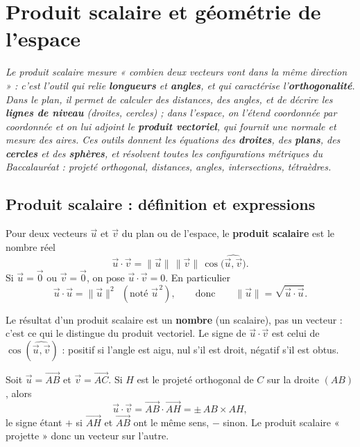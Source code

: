 \chapter{Produit scalaire et géométrie de l'espace}

\noindent\textit{Le produit scalaire mesure « combien deux vecteurs vont dans la même
direction » : c'est l'outil qui relie \textbf{longueurs} et \textbf{angles}, et qui
caractérise l'\textbf{orthogonalité}. Dans le plan, il permet de calculer des distances,
des angles, et de décrire les \textbf{lignes de niveau} (droites, cercles) ; dans l'espace,
on l'étend coordonnée par coordonnée et on lui adjoint le \textbf{produit vectoriel}, qui
fournit une normale et mesure des aires. Ces outils donnent les équations des \textbf{droites},
des \textbf{plans}, des \textbf{cercles} et des \textbf{sphères}, et résolvent toutes les
configurations métriques du Baccalauréat : projeté orthogonal, distances, angles, intersections,
tétraèdres.}
\vspace{8pt}

\section{Produit scalaire : définition et expressions}

\begin{definition}
Pour deux vecteurs $\vec u$ et $\vec v$ du plan ou de l'espace, le \textbf{produit scalaire}
est le nombre réel
\[
\vec u\cdot\vec v=\|\vec u\|\,\|\vec v\|\,\cos\big(\widehat{\vec u,\vec v}\big).
\]
Si $\vec u=\vec 0$ ou $\vec v=\vec 0$, on pose $\vec u\cdot\vec v=0$. En particulier
\[
\vec u\cdot\vec u=\|\vec u\|^{2}\ \ (\text{noté }\vec u^{\,2}),\qquad\text{donc}\qquad \|\vec u\|=\sqrt{\vec u\cdot\vec u}.
\]
\end{definition}

\begin{remarque}
Le résultat d'un produit scalaire est un \textbf{nombre} (un scalaire), pas un vecteur :
c'est ce qui le distingue du produit vectoriel. Le signe de $\vec u\cdot\vec v$ est celui
de $\cos(\widehat{\vec u,\vec v})$ : positif si l'angle est aigu, nul s'il est droit,
négatif s'il est obtus.
\end{remarque}

\begin{propriete}
Soit $\vec u=\overrightarrow{AB}$ et $\vec v=\overrightarrow{AC}$. Si $H$ est le projeté
orthogonal de $C$ sur la droite $(AB)$, alors
\[
\vec u\cdot\vec v=\overrightarrow{AB}\cdot\overrightarrow{AH}=\pm\,AB\times AH,
\]
le signe étant $+$ si $\overrightarrow{AH}$ et $\overrightarrow{AB}$ ont le même sens,
$-$ sinon. Le produit scalaire « projette » donc un vecteur sur l'autre.
\end{propriete}

